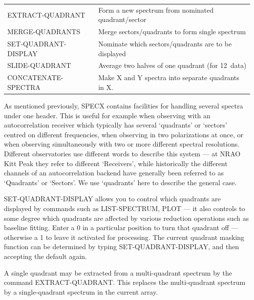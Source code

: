 \documentclass[11pt,twoside]{report}
\begin{document}
\begin{tabular}{ll}
EXTRACT-QUADRANT       & Form a new spectrum from nominated quadrant/sector\\
MERGE-QUADRANTS        & Merge sectors/quadrants to form single spectrum\\
SET-QUADRANT-DISPLAY   & Nominate which sectors/quadrants are to be displayed\\
SLIDE-QUADRANT         & Average two halves of one quadrant (for 12\m\ data)\\
CONCATENATE-SPECTRA    & Make X and Y spectra into separate quadrants in X.\\
\end{tabular}

As mentioned previously, SPECX contains facilities for handling several spectra
under one header. This is useful for example when observing with an
autocorrelation receiver  which typically
has several `quadrants' or `sectors' centred on different frequencies, when
observing in two polarizations  at once, or when
observing simultaneously with two or more different spectral resolutions.
 Different observatories use different words to
describe this system --- at NRAO Kitt Peak they refer to different `Receivers',
 while historically the different channels of an
autocorrelation backend have generally been referred to as `Quadrants' or
`Sectors'. We use `quadrants' here to describe the general case. 

SET-QUADRANT-DISPLAY allows you to control which quadrants are displayed by
commands such as LIST-SPECTRUM, PLOT \etc --- it also controls to some degree
which quadrants are affected by various reduction operations
such as baseline fitting. Enter a 0 in a particular position to turn that
quadrant off --- otherwise a 1 to leave it activated for processing. The current
quadrant masking function can be determined by
typing SET-QUADRANT-DISPLAY, and then accepting the default again. 

 A single quadrant may be extracted
from a multi-quadrant spectrum by the command EXTRACT-QUADRANT. This replaces
the multi-quadrant spectrum by a single-quadrant spectrum in the current array.
\end{document}
